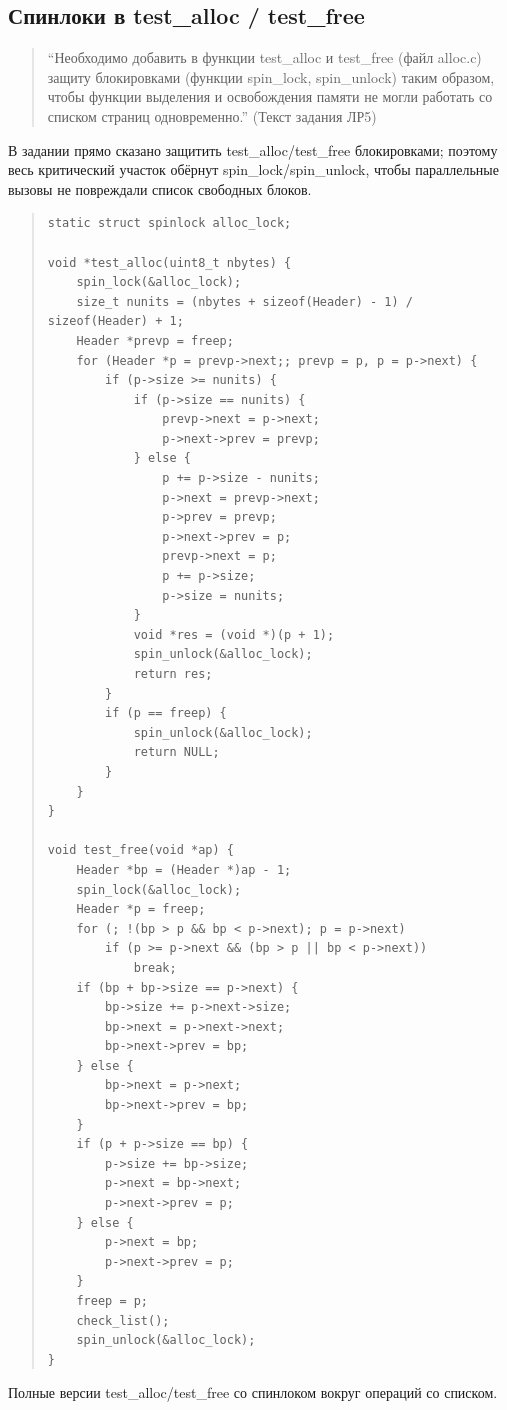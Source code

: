 \documentclass[a4paper,12pt]{article}
\begin{document}
\subsection{Спинлоки в test\_alloc / test\_free}
\begin{quote}
``Необходимо добавить в функции test_alloc и test_free (файл alloc.c) защиту блокировками (функции spin_lock, spin_unlock) таким образом, чтобы функции выделения и освобождения памяти не могли работать со списком страниц одновременно.'' (Текст задания ЛР5)
\end{quote}
В задании прямо сказано защитить test\_alloc/test\_free блокировками; поэтому весь критический участок обёрнут spin\_lock/spin\_unlock, чтобы параллельные вызовы не повреждали список свободных блоков.
\begin{quote}\begin{verbatim}
static struct spinlock alloc_lock;

void *test_alloc(uint8_t nbytes) {
    spin_lock(&alloc_lock);
    size_t nunits = (nbytes + sizeof(Header) - 1) / sizeof(Header) + 1;
    Header *prevp = freep;
    for (Header *p = prevp->next;; prevp = p, p = p->next) {
        if (p->size >= nunits) {
            if (p->size == nunits) {
                prevp->next = p->next;
                p->next->prev = prevp;
            } else {
                p += p->size - nunits;
                p->next = prevp->next;
                p->prev = prevp;
                p->next->prev = p;
                prevp->next = p;
                p += p->size;
                p->size = nunits;
            }
            void *res = (void *)(p + 1);
            spin_unlock(&alloc_lock);
            return res;
        }
        if (p == freep) {
            spin_unlock(&alloc_lock);
            return NULL;
        }
    }
}

void test_free(void *ap) {
    Header *bp = (Header *)ap - 1;
    spin_lock(&alloc_lock);
    Header *p = freep;
    for (; !(bp > p && bp < p->next); p = p->next)
        if (p >= p->next && (bp > p || bp < p->next))
            break;
    if (bp + bp->size == p->next) {
        bp->size += p->next->size;
        bp->next = p->next->next;
        bp->next->prev = bp;
    } else {
        bp->next = p->next;
        bp->next->prev = bp;
    }
    if (p + p->size == bp) {
        p->size += bp->size;
        p->next = bp->next;
        p->next->prev = p;
    } else {
        p->next = bp;
        p->next->prev = p;
    }
    freep = p;
    check_list();
    spin_unlock(&alloc_lock);
}
\end{verbatim}\end{quote}
Полные версии test\_alloc/test\_free со спинлоком вокруг операций со списком.
\end{document}
